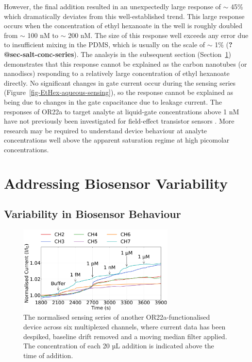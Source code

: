 \documentclass[
  a4paper,
]{scrbook}
\begin{document}
However, the final addition resulted in an unexpectedly large response
of \(\sim\) 45\% which dramatically deviates from this well-established
trend. This large response occurs when the concentration of ethyl
hexanoate in the well is roughly doubled from \(\sim\) 100 nM to
\(\sim\) 200 nM. The size of this response well exceeds any error due to
insufficient mixing in the PDMS, which is usually on the scale of
\(\sim\) 1\% (\textbf{?@sec-salt-conc-series}). The analsyis in the
subsequent section (Section~\ref{sec-variability}) demonstrates that
this response cannot be explained as the carbon nanotubes (or nanodiscs)
responding to a relatively large concentration of ethyl hexanoate
directly. No significant changes in gate current occur during the
sensing series (Figure~\ref{fig-EtHex-aqueous-sensing}), so the response
cannot be explained as being due to changes in the gate capacitance due
to leakage current. The responses of OR22a to target analyte at
liquid-gate concentrations above 1 nM have not previously been
investigated for field-effect transistor sensors
\autocite{Murugathas2019a,Murugathas2020}. More research may be required
to understand device behaviour at analyte concentrations well above the
apparent saturation regime at high picomolar concentrations.

\hypertarget{sec-variability}{%
\section{Addressing Biosensor Variability}\label{sec-variability}}

\hypertarget{sec-variability-biosensor}{%
\subsection{Variability in Biosensor
Behaviour}\label{sec-variability-biosensor}}

\begin{figure}

{\centering \includegraphics[width=0.7\textwidth,height=\textheight]{figures/ch8/Q4C4_OR22a_Functionalised_filtered_detrend_trunc_arrows_normalised.png}

}

\caption{\label{fig-OR22a-variability}The normalised sensing series of
another OR22a-functionalised device across six multiplexed channels,
where current data has been despiked, baseline drift removed and a
moving median filter applied. The concentration of each 20 µL addition
is indicated above the time of addition.}

\end{figure}
\end{document}
